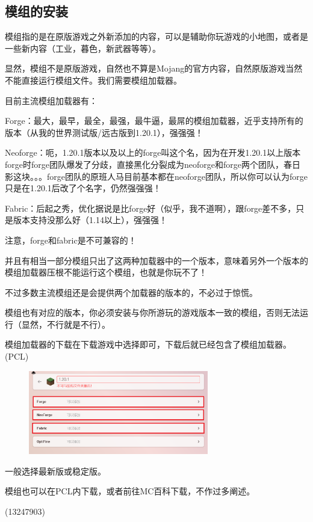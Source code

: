 \documentclass[UTF8,a4paper]{article}
\begin{document}
		\subsection{模组的安装}
			\hypertarget{1.5}{}
			\par 模组指的是在原版游戏之外新添加的内容，可以是辅助你玩游戏的小地图，或者是一些新内容（工业，暮色，新武器等等）。
			\par 显然，模组不是原版游戏，自然也不算是Mojang的官方内容，自然原版游戏当然不能直接运行模组文件。我们需要模组加载器。
			\par 目前主流模组加载器有：
			\par Forge：最大，最早，最全，最强，最牛逼，最屌的模组加载器，近乎支持所有的版本（从我的世界测试版/远古版到1.20.1），强强强！
			\par Neoforge：呃，1.20.1版本以及以上的forge叫这个名，因为在开发1.20.1以上版本forge时forge团队爆发了分歧，直接黑化分裂成为neoforge和forge两个团队，春日影这块。。。forge团队的原班人马目前基本都在neoforge团队，所以你可以认为forge只是在1.20.1后改了个名字，仍然强强强！
			\par Fabric：后起之秀，优化据说是比forge好（似乎，我不道啊），跟forge差不多，只是版本支持没那么好（1.14以上），强强强！
			\par 注意，forge和fabric是不可兼容的！
			\par 并且有相当一部分模组只出了这两种加载器中的一个版本，意味着另外一个版本的模组加载器压根不能运行这个模组，也就是你玩不了！
			\par 不过多数主流模组还是会提供两个加载器的版本的，不必过于惊慌。
			\par 模组也有对应的版本，你必须安装与你所游玩的游戏版本一致的模组，否则无法运行（显然，不行就是不行）。
			\par 模组加载器的下载在下载游戏中选择即可，下载后就已经包含了模组加载器。(PCL)
			\begin{figure}[H] %
				\centering %
				\includegraphics[width=0.7\textwidth]{./Pictures/PCL_2.jpg} %
			\end{figure}
			\par 一般选择最新版或稳定版。
			\par 模组也可以在PCL内下载，或者前往MC百科下载，不作过多阐述。
			\begin{flushright}(13247903)\end{flushright}
\end{document}
